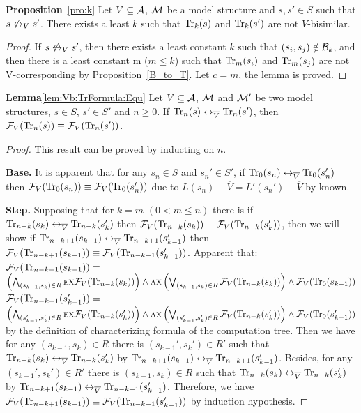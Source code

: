 \documentclass{article}
\begin{document}
\textbf{Proposition}~\ref{pro:k}   Let $V\subseteq {\cal A}$, ${\cal M}$ be a model structure and $s,s'\in S$
  such that $s\not\leftrightarrow_V s'$.
  There exists a least  $k$ such that
  $\textrm{Tr}_k(s)$ and $\textrm{Tr}_k(s')$ are not $V$-bisimilar.\\
\begin{proof}
If $s\not\leftrightarrow_V s'$, then there exists a least constant $k$ such that $(s_i, s_j) \notin {\cal B}_k$, and then there is a least constant m ($m \leq k$) such that $\textrm{Tr}_m(s_i)$ and $\textrm{Tr}_m(s_j)$ are not V-corresponding by Proposition~\ref{B_to_T}. Let $c=m$, the lemma is proved.
\end{proof}









\textbf{Lemma}\ref{lem:Vb:TrFormula:Equ} Let $V\subseteq {\cal A}$, ${\cal M}$ and ${\cal M}'$ be two model structures,
$s\in S$, $s'\in S'$ and $n\ge 0$. If $\textrm{Tr}_n(s) \leftrightarrow_{\overline V} \textrm{Tr}_n(s')$, then ${\cal F}_V(\textrm{Tr}_n(s)) \equiv {\cal F}_V(\textrm{Tr}_n(s'))$.\\
\begin{proof}
This result can be proved by inducting on $n$.

\textbf{Base.} It is apparent that for any $s_n\in S$ and $s_n' \in S'$, if $\textrm{Tr}_0(s_n) \leftrightarrow_{\overline V} \textrm{Tr}_0(s_n')$ then ${\cal F}_V(\textrm{Tr}_0(s_n)) \equiv {\cal F}_V(\textrm{Tr}_0(s_n'))$ due to $L(s_n) - \overline V = L'(s_n') - \overline V$ by known.

\textbf{Step.} Supposing that for $k=m$ $(0< m \leq n)$ there is if $\textrm{Tr}_{n-k}(s_k) \leftrightarrow_{\overline V} \textrm{Tr}_{n-k}(s_k')$ then ${\cal F}_V(\textrm{Tr}_{n-k}(s_k)) \equiv {\cal F}_V(\textrm{Tr}_{n-k}(s_k'))$, then we will show if $\textrm{Tr}_{n-k+1}(s_{k-1}) \leftrightarrow_{\overline V} \textrm{Tr}_{n-k+1}(s_{k-1}')$ then ${\cal F}_V(\textrm{Tr}_{n-k+1}(s_{k-1})) \equiv {\cal F}_V(\textrm{Tr}_{n-k+1}(s_{k-1}'))$. Apparent that:\\
 ${\cal F}_V(\textrm{Tr}_{n-k+1}(s_{k-1})) =$
 $\left(\bigwedge_{(s_{k-1},s_k)\in R}
    \textsc{e} \textsc{x} {\cal F}_V(\textrm{Tr}_{n-k}(s_k))\right)
    \wedge \textsc{a} \textsc{x}\left(\bigvee_{(s_{k-1},s_k)\in R}
    {\cal F}_V(\textrm{Tr}_{n-k}(s_k) )\right)
    \wedge {\cal F}_V(\textrm{Tr}_0(s_{k-1}))$\\
 ${\cal F}_V(\textrm{Tr}_{n-k+1}(s_{k-1}')) =$
 $\left(\bigwedge_{(s_{k-1}',s_k')\in R}
    \textsc{e} \textsc{x} {\cal F}_V(\textrm{Tr}_{n-k}(s_k'))\right)
    \wedge \textsc{a} \textsc{x}\left(\bigvee_{(s_{k-1}',s_k')\in R}
    {\cal F}_V(\textrm{Tr}_{n-k}(s_k') )\right)
    \wedge {\cal F}_V(\textrm{Tr}_0(s_{k-1}'))$ by the definition of characterizing formula of the computation tree.
 Then we have for any $(s_{k-1}, s_k) \in R$ there is $(s_{k-1}', s_k') \in R'$ such that $\textrm{Tr}_{n-k}(s_k) \leftrightarrow_{\overline V} \textrm{Tr}_{n-k}(s_k')$ by $\textrm{Tr}_{n-k+1}(s_{k-1}) \leftrightarrow_{\overline V} \textrm{Tr}_{n-k+1}(s_{k-1}')$. Besides, for any $(s_{k-1}', s_k') \in R'$ there is $(s_{k-1}, s_k) \in R$ such that $\textrm{Tr}_{n-k}(s_k) \leftrightarrow_{\overline V} \textrm{Tr}_{n-k}(s_k')$ by $\textrm{Tr}_{n-k+1}(s_{k-1}) \leftrightarrow_{\overline V} \textrm{Tr}_{n-k+1}(s_{k-1}')$.
 Therefore, we have ${\cal F}_V(\textrm{Tr}_{n-k+1}(s_{k-1})) \equiv {\cal F}_V(\textrm{Tr}_{n-k+1}(s_{k-1}'))$ by induction hypothesis.
\end{proof}
\end{document}
